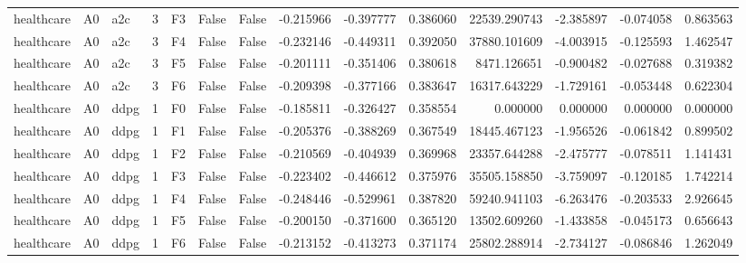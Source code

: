 \begin{tabular}{lllrlllrrrrrrr}
healthcare &      A0 &       a2c &     3 &  F3 &           False &            False & -0.215966 & -0.397777 & 0.386060 &     22539.290743 &          -2.385897 &       -0.074058 &            0.863563 \\
healthcare &      A0 &       a2c &     3 &  F4 &           False &            False & -0.232146 & -0.449311 & 0.392050 &     37880.101609 &          -4.003915 &       -0.125593 &            1.462547 \\
healthcare &      A0 &       a2c &     3 &  F5 &           False &            False & -0.201111 & -0.351406 & 0.380618 &      8471.126651 &          -0.900482 &       -0.027688 &            0.319382 \\
healthcare &      A0 &       a2c &     3 &  F6 &           False &            False & -0.209398 & -0.377166 & 0.383647 &     16317.643229 &          -1.729161 &       -0.053448 &            0.622304 \\
healthcare &      A0 &      ddpg &     1 &  F0 &           False &            False & -0.185811 & -0.326427 & 0.358554 &         0.000000 &           0.000000 &        0.000000 &            0.000000 \\
healthcare &      A0 &      ddpg &     1 &  F1 &           False &            False & -0.205376 & -0.388269 & 0.367549 &     18445.467123 &          -1.956526 &       -0.061842 &            0.899502 \\
healthcare &      A0 &      ddpg &     1 &  F2 &           False &            False & -0.210569 & -0.404939 & 0.369968 &     23357.644288 &          -2.475777 &       -0.078511 &            1.141431 \\
healthcare &      A0 &      ddpg &     1 &  F3 &           False &            False & -0.223402 & -0.446612 & 0.375976 &     35505.158850 &          -3.759097 &       -0.120185 &            1.742214 \\
healthcare &      A0 &      ddpg &     1 &  F4 &           False &            False & -0.248446 & -0.529961 & 0.387820 &     59240.941103 &          -6.263476 &       -0.203533 &            2.926645 \\
healthcare &      A0 &      ddpg &     1 &  F5 &           False &            False & -0.200150 & -0.371600 & 0.365120 &     13502.609260 &          -1.433858 &       -0.045173 &            0.656643 \\
healthcare &      A0 &      ddpg &     1 &  F6 &           False &            False & -0.213152 & -0.413273 & 0.371174 &     25802.288914 &          -2.734127 &       -0.086846 &            1.262049 \\

\end{tabular}
